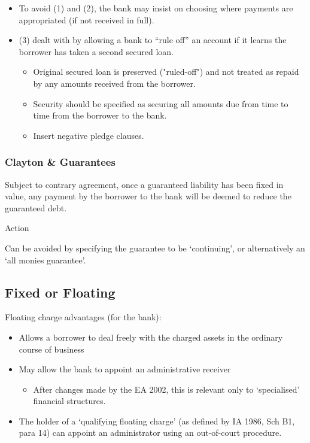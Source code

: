 \documentclass[
]{article}
\providecommand{\tightlist}{%
  \setlength{\itemsep}{0pt}\setlength{\parskip}{0pt}}
\newenvironment{env-0174d31b-3f44-410b-9ae6-7a7b66b1e278}
{
    \savenotes\tcolorbox[blanker,breakable,left=5pt,borderline west={2pt}{-4pt}{aquamarine}]
}
{
    \endtcolorbox\spewnotes
}
\begin{document}
\begin{itemize}
\tightlist
\item
  To avoid (1) and (2), the bank may insist on choosing where payments
  are appropriated (if not received in full).
\item
  (3) dealt with by allowing a bank to ``rule off'' an account if it
  learns the borrower has taken a second secured loan.

  \begin{itemize}
  \tightlist
  \item
    Original secured loan is preserved ("ruled-off") and not treated as
    repaid by any amounts received from the borrower.
  \item
    Security should be specified as securing all amounts due from time
    to time from the borrower to the bank.
  \item
    Insert negative pledge clauses.
  \end{itemize}
\end{itemize}

\hypertarget{clayton-guarantees}{%
\subsubsection{Clayton \& Guarantees}\label{clayton-guarantees}}

Subject to contrary agreement, once a guaranteed liability has been
fixed in value, any payment by the borrower to the bank will be deemed
to reduce the guaranteed debt.

\begin{env-0174d31b-3f44-410b-9ae6-7a7b66b1e278}

Action

Can be avoided by specifying the guarantee to be `continuing', or
alternatively an `all monies guarantee'.

\end{env-0174d31b-3f44-410b-9ae6-7a7b66b1e278}

\hypertarget{fixed-or-floating}{%
\subsection{Fixed or Floating}\label{fixed-or-floating}}

Floating charge advantages (for the bank):

\begin{itemize}
\tightlist
\item
  Allows a borrower to deal freely with the charged assets in the
  ordinary course of business
\item
  May allow the bank to appoint an administrative receiver

  \begin{itemize}
  \tightlist
  \item
    After changes made by the EA 2002, this is relevant only to
    `specialised' financial structures.
  \end{itemize}
\item
  The holder of a `qualifying floating charge' (as defined by IA 1986,
  Sch B1, para 14) can appoint an administrator using an out-of-court
  procedure.
\end{itemize}
\end{document}
